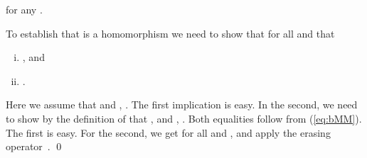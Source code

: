 \documentclass[fleqn]{LMCS}
\theoremstyle{plain}\newtheorem{satz}[thm]{Satz}
\theoremstyle{plain}\newtheorem{hyp}[thm]{Hypothesis}
\theoremstyle{plain}\newtheorem{hyps}[thm]{Hypotheses}
\theoremstyle{definition}\newtheorem{note}[thm]{Note}
\newcommand{\?}{\mbox{?}}
\begin{document}
for any . 

To establish that  is a homomorphism we need to show that 
for all  and  that 
\begin{enumerate}[(i)]
\item , and
\item . 
\end{enumerate}
Here we assume that  and , . 
The first implication is easy. 
In the second, we need to show by the definition of  that 
, and , 
. Both equalities follow from (\ref{eq:bMM}). The first is easy. For the second, 
we get  
for all  and , 
and apply the erasing operator~. \qed
\end{document}
